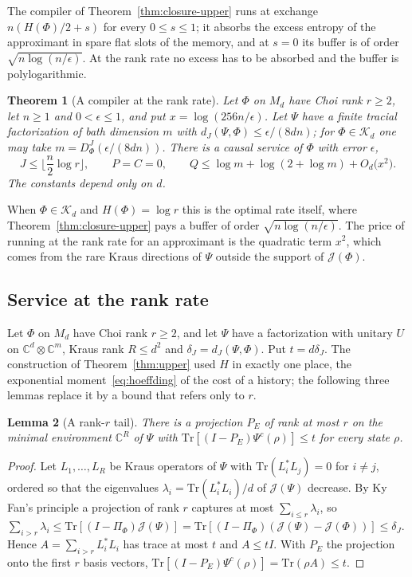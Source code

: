 \documentclass[11pt,a4paper]{article}
\theoremstyle{plain}
\newtheorem{theorem}{Theorem}[section]
\newtheorem{lemma}[theorem]{Lemma}
\theoremstyle{definition}
\theoremstyle{remark}
\newcommand{\DChoi}{D^{J}}
\newcommand{\dJ}{d_J}
\begin{document}
The compiler of Theorem~\ref{thm:closure-upper} runs at exchange $n(H(\Phi)/2+s)$ for every $0\le s\le1$; it absorbs the excess entropy of the
approximant in spare flat slots of the memory, and at $s=0$ its buffer is of order $\sqrt{n\log(n/\epsilon)}$. At the rank rate no excess has to be
absorbed and the buffer is polylogarithmic.

\begin{theorem}[A compiler at the rank rate]\label{thm:rank-rate}
Let $\Phi$ on $M_d$ have Choi rank $r\ge2$, let $n\ge1$ and $0<\epsilon\le1$, and put $x=\log(256n/\epsilon)$. Let $\Psi$ have a finite tracial factorization of bath
dimension $m$ with $\dJ(\Psi,\Phi)\le\epsilon/(8dn)$; for $\Phi\in\mathcal K_d$ one may take $m=\DChoi_\Phi(\epsilon/(8dn))$. There is a causal service of $\Phi$ with error
$\epsilon$,
\[
J\le\Big\lfloor\frac n2\log r\Big\rfloor,\qquad P=C=0,\qquad Q\le\log m+\log(2+\log m)+O_d\big(x^2\big) .
\]
The constants depend only on $d$.
\end{theorem}

When $\Phi\in\mathcal K_d$ and $H(\Phi)=\log r$ this is the optimal rate itself, where Theorem~\ref{thm:closure-upper} pays a buffer of order $\sqrt{n\log(n/\epsilon)}$. The price of
running at the rank rate for an approximant is the quadratic term $x^2$, which comes from the rare Kraus directions of $\Psi$ outside the support of
$\mathcal J(\Phi)$.


\subsection{Service at the rank rate}

Let $\Phi$ on $M_d$ have Choi rank $r\ge2$, and let $\Psi$ have a factorization with unitary $U$ on $\mathbb C^d\otimes\mathbb C^m$, Kraus rank $R\le d^2$ and
$\delta_J=\dJ(\Psi,\Phi)$. Put $t=d\delta_J$. The construction of Theorem~\ref{thm:upper} used $H$ in exactly one place, the exponential moment~\eqref{eq:hoeffding}
of the cost of a history; the following three lemmas replace it by a bound that refers only to $r$.

\begin{lemma}[A rank-$r$ tail]\label{lem:rank-tail}
There is a projection $P_E$ of rank at most $r$ on the minimal environment $\mathbb C^R$ of $\Psi$ with $\mathrm{Tr}[(I-P_E)\Psi^c(\rho)]\le t$ for every state $\rho$.
\end{lemma}

\begin{proof}
Let $L_1,\dots,L_R$ be Kraus operators of $\Psi$ with $\mathrm{Tr}(L_i^*L_j)=0$ for $i\ne j$, ordered so that the eigenvalues $\lambda_i=\mathrm{Tr}(L_i^*L_i)/d$ of $\mathcal J(\Psi)$
decrease. By Ky Fan's principle a projection of rank $r$ captures at most $\sum_{i\le r}\lambda_i$, so
$\sum_{i>r}\lambda_i\le\mathrm{Tr}[(I-\Pi_\Phi)\mathcal J(\Psi)]=\mathrm{Tr}[(I-\Pi_\Phi)(\mathcal J(\Psi)-\mathcal J(\Phi))]\le\delta_J$. Hence $A=\sum_{i>r}L_i^*L_i$ has trace at most $t$ and
$A\le tI$. With $P_E$ the projection onto the first $r$ basis vectors, $\mathrm{Tr}[(I-P_E)\Psi^c(\rho)]=\mathrm{Tr}(\rho A)\le t$.
\end{proof}
\end{document}
